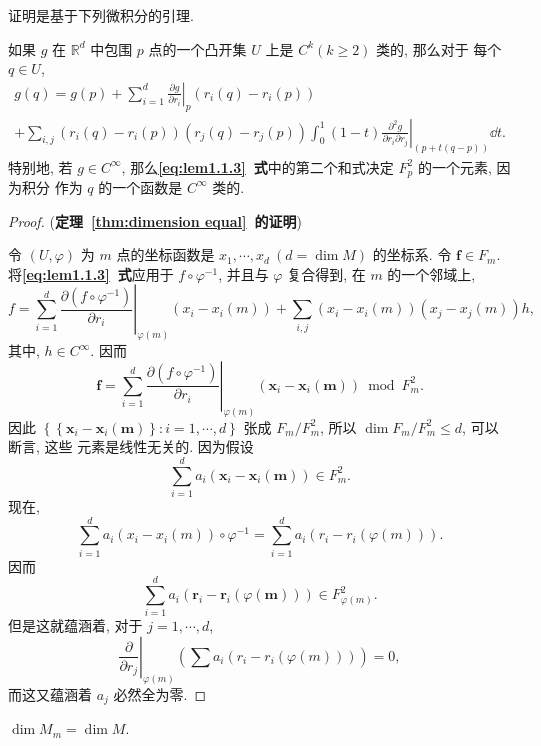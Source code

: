 证明是基于下列微积分的引理.
\begin{lem}
如果 $g$ 在 $\mathbb{R}^d$ 中包围 $p$ 点的一个凸开集 $U$ 上是 $C^k(k \geqslant 2)$ 类的, 那么对于 每个 $q \in U$,
\begin{multline}\label{eq:lem1.1.3}
g(q)= g(p)+\left.\sum_{i=1}^d \frac{\partial g}{\partial r_i}\right|_p\left(r_i(q)-r_i(p)\right) \\
 +\left.\sum_{i, j}\left(r_i(q)-r_i(p)\right)\left(r_j(q)-r_j(p)\right) \int_0^1(1-t) \frac{\partial^2 g}{\partial r_i \partial r_j}\right|_{(p+t(q-p))} \dd t .
\end{multline}
特别地, 若 $g \in C^{\infty}$, 那么\textbf{\eqref{eq:lem1.1.3}~式}中的第二个和式决定 $F_p^2$ 的一个元素, 因为积分 作为 $q$ 的一个函数是 $C^{\infty}$ 类的.
\end{lem}
\begin{proof}{(\textbf{定理~\ref{thm:dimension equal}~的证明})}

令 $(U, \varphi)$ 为 $m$ 点的坐标函数是 $x_1, \cdots, x_d ~(d=\dim M)$ 的坐标系. 令 $\mathbf{f} \in F_m$. 将\textbf{\eqref{eq:lem1.1.3}~式}应用于 $f \circ \varphi^{-1}$, 并且与 $\varphi$ 复合得到, 在 $m$ 的一个邻域上,
$$
f=\left.\sum_{i=1}^d \frac{\partial\left(f \circ \varphi^{-1}\right)}{\partial r_i}\right|_{\varphi(m)}\left(x_i-x_i(m)\right)+\sum_{i, j}\left(x_i-x_i(m)\right)\left(x_j-x_j(m)\right) h,
$$
其中, $h \in C^{\infty}$. 因而
$$
\mathbf{f}=\left.\sum_{i=1}^d \frac{\partial\left(f \circ \varphi^{-1}\right)}{\partial r_i}\right|_{\varphi(m)}\left(\mathbf{x}_i-\mathbf{x}_i(\mathbf{m})\right) \bmod F_m^2 .
$$
因此 $\left\{\left\{\mathbf{x}_i-\mathbf{x}_i(\mathbf{m})\right\}: i=1, \cdots, d\right\}$ 张成 $F_m / F_m^2$, 所以 $\operatorname{dim} F_m / F_m^2 \leqslant d$, 可以断言, 这些 元素是线性无关的. 因为假设
$$
\sum_{i=1}^d a_i\left(\mathbf{x}_i-\mathbf{x}_i(\mathbf{m})\right) \in F_m^2 .
$$
现在,
$$
\sum_{i=1}^d a_i\left(x_i-x_i(m)\right) \circ \varphi^{-1}=\sum_{i=1}^d a_i\left(r_i-r_i(\varphi(m))\right) .
$$
因而
$$
\sum_{i=1}^d a_i\left(\mathbf{r}_i-\mathbf{r}_i(\varphi(\mathbf{m}))\right) \in F_{\varphi(m)}^2 .
$$
但是这就蕴涵着, 对于 $j=1, \cdots, d$,
$$
\left.\frac{\partial}{\partial r_j}\right|_{\varphi(m)}\left(\sum a_i\left(r_i-r_i(\varphi(m))\right)\right)=0,
$$
而这又蕴涵着 $a_j$ 必然全为零.
\end{proof}

\begin{cor}
    $\dim M_m=\dim M$.
\end{cor}
